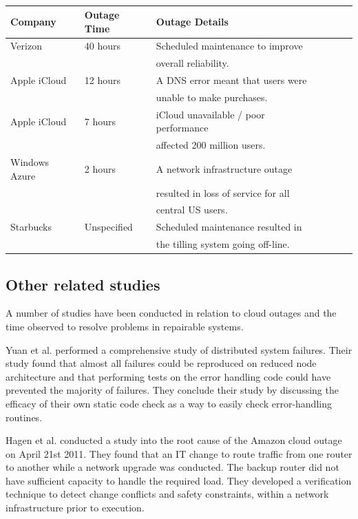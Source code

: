\documentclass[conference]{IEEEtran}
\begin{document}
\begin {table}[]
\caption {}
\begin{flushleft}
\begin{tabular}{l*{5}{l}r} Company & Outage Time & Outage Details 
\\ \hline Verizon	& 40 hours & Scheduled maintenance to  improve 
\\ & & overall reliability.
\\ Apple iCloud & 12 hours & A DNS error meant that users were 
\\ & & unable to make  purchases.
\\ Apple iCloud	& 7 hours & iCloud unavailable / poor performance 
\\ & & affected 200 million  users.
\\  Windows Azure & 2 hours & A network infrastructure outage  
\\ & & resulted in loss of service for all 
\\ & & central US users.
\\  Starbucks & Unspecified &  Scheduled maintenance resulted in 
\\ & & the tilling system going off-line.  \end{tabular}
\end{flushleft}
\end{table}



\subsection{Other related studies}
A number of studies have been conducted in relation to cloud outages and the time observed to resolve problems in repairable systems. \par

Yuan et al. \cite{yuan2014simple} performed a comprehensive study of distributed system failures. Their study found that almost all failures could be reproduced on reduced node architecture and that performing tests on the error handling code could have prevented the majority of failures. They conclude their study by discussing the efficacy of their own static code check as a way to easily check error-handling routines. \par

Hagen et al. \cite{hagen2012efficient} conducted a study into the root cause of the Amazon cloud outage on April 21st 2011. They found that an IT change to route traffic from one router to another while a network upgrade was conducted. The backup router did not have sufficient capacity to handle the required load. They developed a verification technique to detect change conflicts and safety constraints, within a network infrastructure prior to execution. \par
\end{document}
